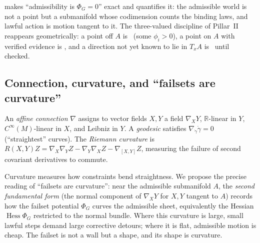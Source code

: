  makes ``admissibility is $\Phi_G=0$'' exact and quantifies
it: the admissible world is not a point but a submanifold whose codimension counts
the binding laws, and lawful action is motion tangent to it. The three-valued
discipline of Pillar~II reappears geometrically: a point off $A$ is \
(some $\phi_i>0$), a point on $A$ with verified evidence is \admitted, and a
direction not yet known to lie in $T_xA$ is \unknownstat\ until checked.

\subsection{Connection, curvature, and ``failsets are curvature''}
\label{sec:geo-curvature}

\begin{definition}
An \emph{affine connection} $\nabla$ assigns to vector fields $X,Y$ a field
$\nabla_XY$, $\mathbb R$-linear in $Y$, $C^\infty(M)$-linear in $X$, and Leibniz
in $Y$. A \emph{geodesic} satisfies $\nabla_{\dot\gamma}\dot\gamma=0$
(``straightest'' curves). The \emph{Riemann curvature} is
$R(X,Y)Z=\nabla_X\nabla_YZ-\nabla_Y\nabla_XZ-\nabla_{[X,Y]}Z$, measuring the
failure of second covariant derivatives to commute.
\end{definition}

Curvature measures how constraints bend straightness. We propose the precise
reading of ``failsets are curvature'': near the admissible submanifold $A$, the
\emph{second fundamental form} (the normal component of $\nabla_XY$ for $X,Y$
tangent to $A$) records how the failset potential $\Phi_G$ curves the admissible
sheet, equivalently the Hessian $\operatorname{Hess}\Phi_G$ restricted to the
normal bundle. Where this curvature is large, small lawful steps demand large
corrective detours; where it is flat, admissible motion is cheap. The failset is
not a wall but a shape, and its shape is curvature.

